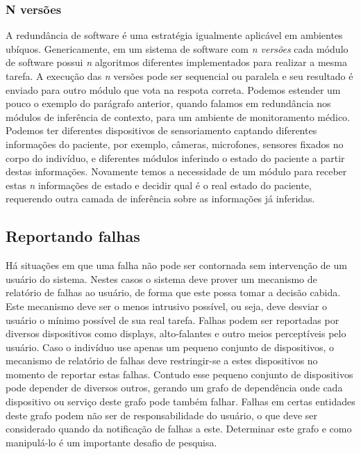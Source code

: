 
\subsubsection*{N versões} %

A redundância de software é uma estratégia igualmente aplicável em ambientes ubíquos. Genericamente, em um sistema de software com \emph{n versões} cada módulo de software possui \emph{n} algoritmos diferentes implementados para realizar a mesma tarefa. A execução das \emph{n} versões pode ser sequencial ou paralela e seu resultado é enviado para outro módulo que vota na respota correta. Podemos estender um pouco o exemplo do parágrafo anterior, quando falamos em redundância nos módulos de inferência de contexto, para um ambiente de monitoramento médico. Podemos ter diferentes dispositivos de sensoriamento captando diferentes informações do paciente, por exemplo, câmeras, microfones, sensores fixados no corpo do indivíduo, e diferentes módulos inferindo o estado do paciente a partir destas informações. Novamente temos a necessidade de um módulo para receber estas \emph{n} informações de estado e decidir qual é o real estado do paciente, requerendo outra camada de inferência sobre as informações já inferidas.


\subsection{Reportando falhas} %
\label{sub:reportando_falhas}

Há situações em que uma falha não pode ser contornada sem intervenção de um usuário do sistema. Nestes casos o sistema deve prover um mecanismo de relatório de falhas ao usuário, de forma que este possa tomar a decisão cabida. Este mecanismo deve ser o menos intrusivo possível, ou seja, deve desviar o usuário o mínimo possível de sua real tarefa. Falhas podem ser reportadas por diversos dispositivos como displays, alto-falantes e outro meios perceptíveis pelo usuário. Caso o indivíduo use apenas um pequeno conjunto de dispositivos, o mecanismo de relatório de falhas deve restringir-se a estes dispositivos no momento de reportar estas falhas. Contudo esse pequeno conjunto de dispositivos pode depender de diversos outros, gerando um grafo de dependência onde cada dispositivo ou serviço deste grafo pode também falhar. Falhas em certas entidades deste grafo podem não ser de responsabilidade do usuário, o que deve ser considerado quando da notificação de falhas a este. Determinar este grafo e como manipulá-lo é um importante desafio de pesquisa.


